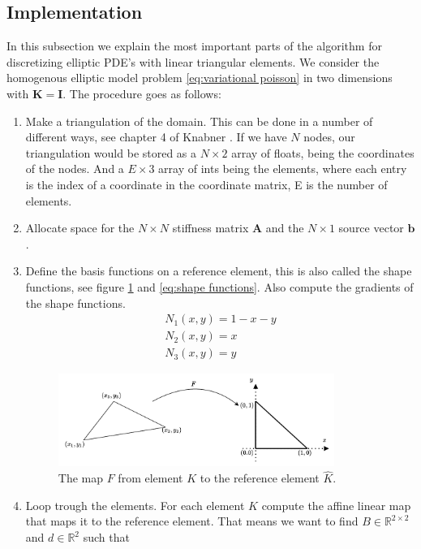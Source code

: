 \documentclass[../Main/main.tex]{subfiles}
\begin{document}
	\subsection*{Implementation}
	In this subsection we explain the most important parts of the algorithm for discretizing elliptic PDE's with linear triangular elements. We consider the homogenous elliptic model problem \eqref{eq:variational poisson} in two dimensions with $\bm{K} = \bm{I}$. The procedure goes as follows:
	\begin{enumerate}
		\item Make a triangulation of the domain. This can be done in a number of different ways, see chapter 4 of Knabner \cite{Knabner}. If we have $N$ nodes, our triangulation would be stored as a $N \times 2$ array of floats, being the coordinates of the nodes. And a $E\times 3$ array of ints being the elements, where each entry is the index of a coordinate in the coordinate matrix, E is the number of elements.
		\item Allocate space for the $N \times N$ stiffness matrix $\bm{A}$ and the $N \times 1$ source vector $\bm{b}$.
		\item Define the basis functions on a reference element, this is also called the shape functions, see figure \ref{fig:reference element} and \eqref{eq:shape functions}. Also compute the gradients of the shape functions. 
		\begin{equation}
			\begin{gathered}\label{eq:shape functions}
				N_1(x,y) = 1-x-y\\
				N_2(x,y) = x\\
				N_3(x,y) = y
			\end{gathered}
		\end{equation}
		\begin{figure}[H]
			\centering
			\includegraphics[width=0.85\textwidth]{reference element.pdf}
			\caption{The map $F$ from element $K$ to the reference element $\hat{K}$.}
			\label{fig:reference element}
		\end{figure}
		\item Loop trough the elements. For each element $K$ compute the affine linear map that maps it to the reference element. That means we want to find $B\in \mathbb{R}^{2\times 2}$ and $d\in \mathbb{R}^2$ such that 

\end{enumerate}
\end{document}
